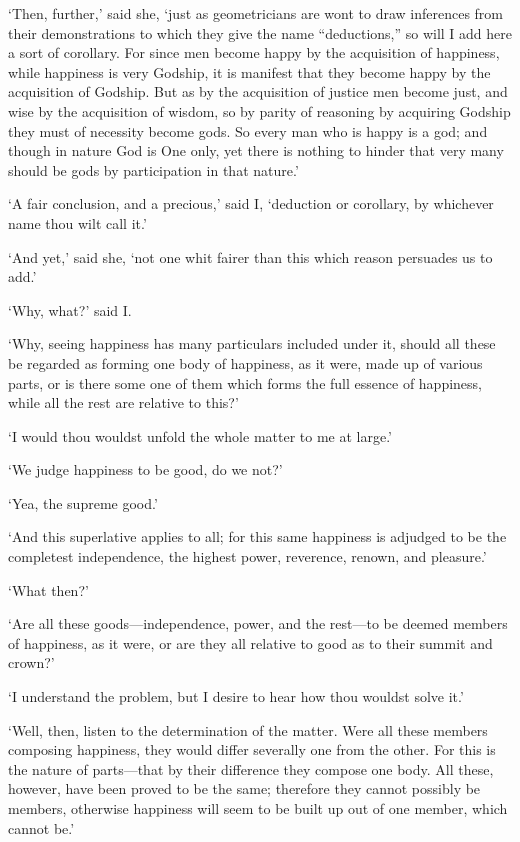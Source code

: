 \documentclass[12pt]{book}
\begin{document}
`Then, further,' said she, `just as geometricians are wont to draw
inferences from their demonstrations to which they give the name
``deductions,'' so will I add here a sort of corollary. For since men
become happy by the acquisition of happiness, while happiness is very
Godship, it is manifest that they become happy by the acquisition of
Godship. But as by the acquisition of justice men become just, and wise
by the acquisition of wisdom, so by parity of reasoning by acquiring
Godship they must of necessity become gods. So every man who is happy is
a god; and though in nature God is One only, yet there is nothing to
hinder that very many should be gods by participation in that nature.'

`A fair conclusion, and a precious,' said I, `deduction or corollary, by
whichever name thou wilt call it.'

`And yet,' said she, `not one whit fairer than this which reason
persuades us to add.'

`Why, what?' said I.

`Why, seeing happiness has many particulars included under it, should
all these be regarded as forming one body of happiness, as it were, made
up of various parts, or is there some one of them which forms the full
essence of happiness, while all the rest are relative to this?'

`I would thou wouldst unfold the whole matter to me at large.'

`We judge happiness to be good, do we not?'

`Yea, the supreme good.'

`And this superlative applies to all; for this same happiness is
adjudged to be the completest independence, the highest power,
reverence, renown, and pleasure.'

`What then?'

`Are all these goods---independence, power, and the rest---to be deemed
members of happiness, as it were, or are they all relative to good as to
their summit and crown?'

`I understand the problem, but I desire to hear how thou wouldst solve
it.'

`Well, then, listen to the determination of the matter. Were all these
members composing happiness, they would differ severally one from the
other. For this is the nature of parts---that by their difference they
compose one body. All these, however, have been proved to be the same;
therefore they cannot possibly be members, otherwise happiness will seem
to be built up out of one member, which cannot be.'
\end{document}
